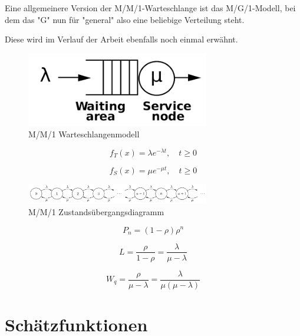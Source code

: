 Eine allgemeinere Version der M/M/1-Warteschlange ist das M/G/1-Modell, bei dem das "G" nun für "general" also eine beliebige Verteilung steht.

Diese wird im Verlauf der Arbeit ebenfalls noch einmal erwähnt.

\begin{figure}[h]
	\centering
	\includegraphics[width=8cm]{bilder/mm1}
	\caption{M/M/1 Warteschlangenmodell}
  \label{fig:mm1}
\end{figure}

\begin{equation}
f_T(x) = \lambda e^{- \lambda t}, \quad t \geq 0
\end{equation}

\begin{equation}
f_S(x) = \mu e^{- \mu t}, \quad t \geq 0
\end{equation}

\begin{figure}[h]
	\centering
	\includegraphics[width=8cm]{bilder/mm1_state}
	\caption{M/M/1 Zustandsübergangsdiagramm}
  \label{fig:mm1_state}
\end{figure}

\begin{equation}
P_n = (1 - \rho) \rho^n
\end{equation}

\begin{equation}
L = \frac{
	\rho
}{
	1 - \rho
} = \frac{
	\lambda
}{
	\mu - \lambda
}
\end{equation}

\begin{equation}
W_q = \frac{
	\rho
}{
	\mu - \lambda
} = \frac{
	\lambda
}{
	\mu ( \mu - \lambda )
}
\end{equation}

\section{Schätzfunktionen}

